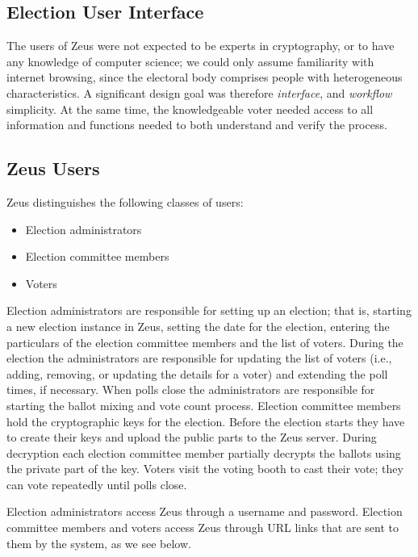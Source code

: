 \documentclass[letterpaper,twocolumn,10pt]{article}
\begin{document}
\subsection{Election User Interface}

The users of Zeus were not expected to be experts in cryptography, or
to have any knowledge of computer science; we could only assume
familiarity with internet browsing, since the electoral body comprises
people with heterogeneous characteristics. A significant design goal
was therefore \emph{interface}, and \emph{workflow} simplicity. At the
same time, the knowledgeable voter needed access to all information
and functions needed to both understand and verify the process.

\subsection{Zeus Users}

Zeus distinguishes the following classes of users:

\begin{itemize}
\item Election administrators
\item Election committee members
\item Voters
\end{itemize}

Election administrators are responsible for setting up an election;
that is, starting a new election instance in Zeus, setting the date
for the election, entering the particulars of the election committee
members and the list of voters. During the election the administrators
are responsible for updating the list of voters (i.e., adding,
removing, or updating the details for a voter) and extending the poll
times, if necessary. When polls close the administrators are
responsible for starting the ballot mixing and vote count process.
Election committee members hold the cryptographic keys for the
election. Before the election starts they have to create their keys
and upload the public parts to the Zeus server. During decryption each
election committee member partially decrypts the ballots using the
private part of the key. Voters visit the voting booth to cast their
vote; they can vote repeatedly until polls close.

Election administrators access Zeus through a username and password.
Election committee members and voters access Zeus through URL links
that are sent to them by the system, as we see below.
\end{document}
